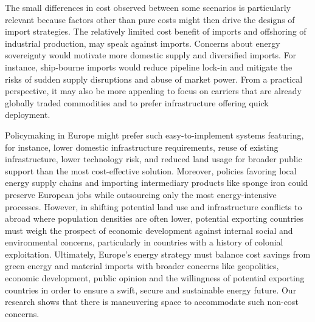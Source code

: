 The small differences in cost observed between some scenarios is particularly
relevant because factors other than pure costs might then drive the designs of
import strategies. The relatively limited cost benefit of imports and offshoring
of industrial production, may speak against imports. Concerns about energy
sovereignty would motivate more domestic supply and diversified imports. For
instance, ship-bourne imports would reduce pipeline lock-in and mitigate the
risks of sudden supply disruptions and abuse of market power.  From a practical
perspective, it may also be more appealing to focus on carriers that are already
globally traded commodities and to prefer infrastructure offering quick
deployment.

Policymaking in Europe might prefer such easy-to-implement systems featuring,
for instance, lower domestic infrastructure requirements, reuse of existing
infrastructure, lower technology risk, and reduced land usage for broader public
support than the most cost-effective solution. Moreover, policies favoring local
energy supply chains and importing intermediary products like sponge iron could
preserve European jobs while outsourcing only the most energy-intensive
processes. However, in shifting potential land use and infrastructure conflicts
to abroad where population densities are often lower, potential exporting
countries must weigh the prospect of economic development against internal
social and environmental concerns, particularly in countries with a history of
colonial exploitation.\cite{tunnGreenHydrogenTransitions2024} Ultimately,
Europe's energy strategy must balance cost savings from green energy and
material imports with broader concerns like geopolitics, economic development,
public opinion and the willingness of potential exporting countries in order to
ensure a swift, secure and sustainable energy future. Our research shows that
there is maneuvering space to accommodate such non-cost concerns.
